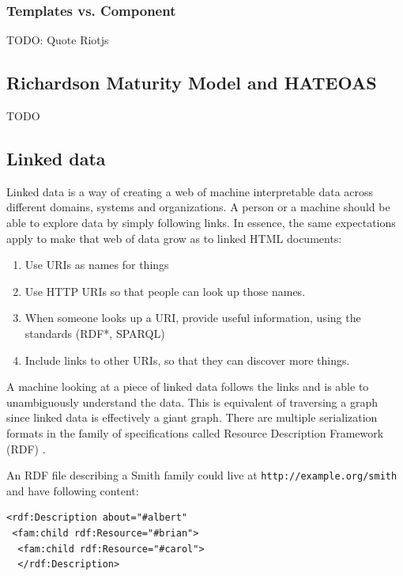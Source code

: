 \subsubsection{Templates vs. Component}

TODO: Quote Riotjs

\subsection{Richardson Maturity Model and HATEOAS}

TODO

\subsection{Linked data}\label{linkeddata}

Linked data is a way of creating a web of machine interpretable data across different domains, systems and organizations. A person or a machine should be able to explore data by simply following links. In essence, the same expectations apply to make that web of data grow as to linked HTML documents: \citep{linkedatafourrules}

\begin{enumerate}
  \item Use URIs as names for things
  \item Use HTTP URIs so that people can look up those names.
  \item When someone looks up a URI, provide useful information, using the standards (RDF*, SPARQL)
  \item Include links to other URIs, so that they can discover more things.
\end{enumerate}

A machine looking at a piece of linked data follows the links and is able to unambiguously understand the data. This is equivalent of traversing a graph since linked data is effectively a giant graph. There are multiple serialization formats in the family of specifications called Resource Description Framework (RDF) \citep{rdfspecification}.

An RDF file describing a Smith family could live at \lstinline{http://example.org/smith} and have following content:

\lstset{language=XML}
\begin{lstlisting}[caption= Simple example of a person as RDF, label=rdfexample]
<rdf:Description about="#albert"
 <fam:child rdf:Resource="#brian">
  <fam:child rdf:Resource="#carol">
  </rdf:Description>
\end{lstlisting}

